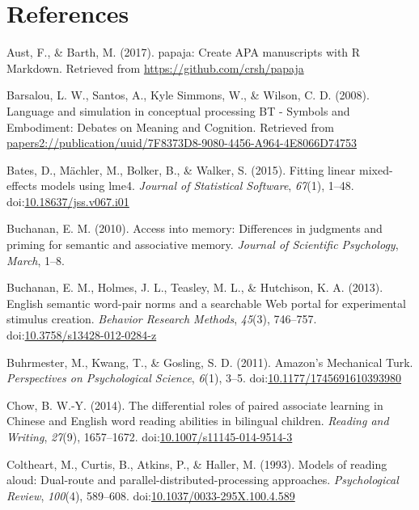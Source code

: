 \documentclass[english,,man]{apa6}
\begin{document}
\newpage

\section{References}\label{references}

\setlength{\parindent}{-0.5in} \setlength{\leftskip}{0.5in}

\hypertarget{refs}{}
\hypertarget{ref-Aust2017}{}
Aust, F., \& Barth, M. (2017). papaja: Create APA manuscripts with R
Markdown. Retrieved from \url{https://github.com/crsh/papaja}

\hypertarget{ref-Barsalou2008}{}
Barsalou, L. W., Santos, A., Kyle Simmons, W., \& Wilson, C. D. (2008).
Language and simulation in conceptual processing BT - Symbols and
Embodiment: Debates on Meaning and Cognition. Retrieved from
\url{papers2://publication/uuid/7F8373D8-9080-4456-A964-4E8066D74753}

\hypertarget{ref-Bates2015}{}
Bates, D., Mächler, M., Bolker, B., \& Walker, S. (2015). Fitting linear
mixed-effects models using lme4. \emph{Journal of Statistical Software},
\emph{67}(1), 1--48.
doi:\href{https://doi.org/10.18637/jss.v067.i01}{10.18637/jss.v067.i01}

\hypertarget{ref-Buchanan2010}{}
Buchanan, E. M. (2010). Access into memory: Differences in judgments and
priming for semantic and associative memory. \emph{Journal of Scientific
Psychology}, \emph{March}, 1--8.

\hypertarget{ref-Buchanan2013}{}
Buchanan, E. M., Holmes, J. L., Teasley, M. L., \& Hutchison, K. A.
(2013). English semantic word-pair norms and a searchable Web portal for
experimental stimulus creation. \emph{Behavior Research Methods},
\emph{45}(3), 746--757.
doi:\href{https://doi.org/10.3758/s13428-012-0284-z}{10.3758/s13428-012-0284-z}

\hypertarget{ref-Buhrmester2011}{}
Buhrmester, M., Kwang, T., \& Gosling, S. D. (2011). Amazon's Mechanical
Turk. \emph{Perspectives on Psychological Science}, \emph{6}(1), 3--5.
doi:\href{https://doi.org/10.1177/1745691610393980}{10.1177/1745691610393980}

\hypertarget{ref-Chow2014}{}
Chow, B. W.-Y. (2014). The differential roles of paired associate
learning in Chinese and English word reading abilities in bilingual
children. \emph{Reading and Writing}, \emph{27}(9), 1657--1672.
doi:\href{https://doi.org/10.1007/s11145-014-9514-3}{10.1007/s11145-014-9514-3}

\hypertarget{ref-Coltheart1993}{}
Coltheart, M., Curtis, B., Atkins, P., \& Haller, M. (1993). Models of
reading aloud: Dual-route and parallel-distributed-processing
approaches. \emph{Psychological Review}, \emph{100}(4), 589--608.
doi:\href{https://doi.org/10.1037/0033-295X.100.4.589}{10.1037/0033-295X.100.4.589}
\end{document}
